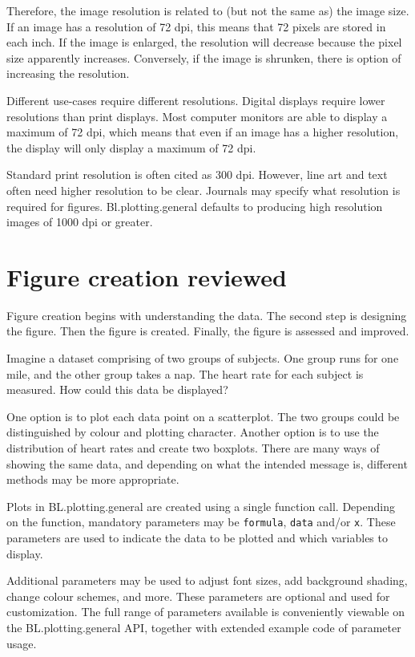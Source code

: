 \documentclass[letterpaper]{article}
\begin{document}
Therefore, the image resolution is related to (but not the same as) the image size. If an image has a resolution of 72 dpi, this means that 72 pixels are stored in each inch. If the image is enlarged, the resolution will decrease because the pixel size apparently increases. Conversely, if the image is shrunken, there is option of increasing the resolution.

Different use-cases require different resolutions. Digital displays require lower resolutions than print displays. Most computer monitors are able to display a maximum of 72 dpi, which means that even if an image has a higher resolution, the display will only display a maximum of 72 dpi. 

Standard print resolution is often cited as 300 dpi. However, line art and text often need higher resolution to be clear. Journals may specify what resolution is required for figures. Bl.plotting.general defaults to producing high resolution images of 1000 dpi or greater.

\section{Figure creation reviewed}
Figure creation begins with understanding the data. The second step is designing the figure. Then the figure is created. Finally, the figure is assessed and improved.

Imagine a dataset comprising of two groups of subjects. One group runs for one mile, and the other group takes a nap. The heart rate for each subject is measured. How could this data be displayed? 

One option is to plot each data point on a scatterplot. The two groups could be distinguished by colour and plotting character. Another option is to use the distribution of heart rates and create two boxplots. There are many ways of showing the same data, and depending on what the intended message is, different methods may be more appropriate.

Plots in BL.plotting.general are created using a single function call. Depending on the function, mandatory parameters may be \verb|formula|, \verb|data| and/or \verb|x|. These parameters are used to indicate the data to be plotted and which variables to display.

Additional parameters may be used to adjust font sizes, add background shading, change colour schemes, and more. These parameters are optional and used for customization. The full range of parameters available is conveniently viewable on the BL.plotting.general API, together with extended example code of parameter usage.
\end{document}
